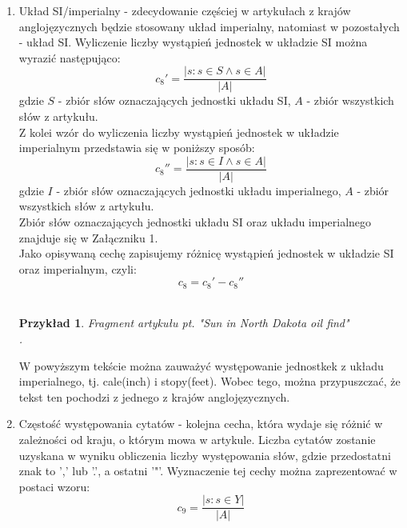\documentclass{classrep}
\newtheorem{exmp}{Przykład}[section]
\begin{document}
\begin{enumerate}
    \item Układ SI/imperialny - zdecydowanie częściej w artykułach z krajów anglojęzycznych będzie stosowany układ imperialny, natomiast w pozostałych - układ SI. 
    Wyliczenie liczby wystąpień jednostek w układzie SI można wyrazić następująco: 
     \begin{equation}
        c_8' = \frac{|{s: s \in S \land s \in A}|}{|A|}
    \end{equation}
    gdzie $S$ - zbiór słów oznaczających jednostki układu SI, $A$ - zbiór wszystkich słów z artykułu. \\
    Z kolei wzór do wyliczenia liczby wystąpień jednostek w układzie imperialnym przedstawia się w poniższy sposób:
    \begin{equation}
        c_8'' = \frac{|{s: s \in I \land s \in A}|}{|A|}
    \end{equation}
    gdzie $I$ - zbiór słów oznaczających jednostki układu imperialnego, $A$ - zbiór wszystkich słów z artykułu.\\ Zbiór słów oznaczających jednostki układu SI oraz układu imperialnego znajduje się w Załączniku 1.\\
    Jako opisywaną cechę zapisujemy różnicę wystąpień jednostek w układzie SI oraz imperialnym, czyli:
    \begin{equation}
        c_8 = {c_8'}-{c_8''}
    \end{equation} \\
    \begin{exmp}Fragment artykułu pt. "Sun in North Dakota oil find" \cite{reuters} \\
    . \\
    \end{exmp}
    W powyższym tekście można zauważyć występowanie jednostkek z układu imperialnego, tj. cale(inch) i stopy(feet). Wobec tego, można przypuszczać, że tekst ten pochodzi z jednego z krajów anglojęzycznych. \\
    \item Częstość występowania cytatów - 
     kolejna cecha, która wydaje się różnić w zależności od kraju, o którym mowa w artykule. Liczba cytatów zostanie uzyskana w wyniku obliczenia liczby występowania słów, gdzie przedostatni znak to ',' lub '.', a ostatni '"'. Wyznaczenie  tej  cechy  można zaprezentować w postaci wzoru:
    \begin{equation}
        c_9 = \frac{|{s: s \in Y}|}{|A|}

\end{equation}
\end{enumerate}
\end{document}
